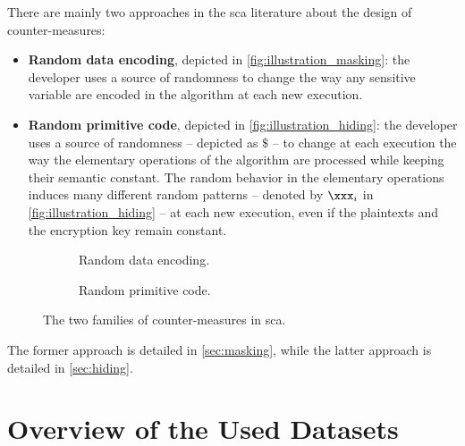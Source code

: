     There are mainly two approaches in the \gls{sca} literature about the design of counter-measures:
    \begin{itemize}
        \item \textbf{Random data encoding}, depicted in \autoref{fig:illustration_masking}: the developer uses a source of randomness to change the way any sensitive variable are encoded in the algorithm at each new execution.
        \item \textbf{Random primitive code}, depicted in \autoref{fig:illustration_hiding}: the developer uses a source of randomness -- depicted as \(\$\) -- to change at each execution the way the elementary operations of the algorithm are processed while keeping their semantic constant.
        The random behavior in the elementary operations induces many different random patterns -- denoted by \(\xxx_i\) in \autoref{fig:illustration_hiding} -- at each new execution, even if the plaintexts and the encryption key remain constant.
    \end{itemize}
    \begin{figure}
        \centering
        \begin{subfigure}{0.49 \textwidth}
            
            \caption{Random data encoding.}
            \label{fig:illustration_masking}
        \end{subfigure}
        \begin{subfigure}{0.49 \textwidth}
            
            \caption{Random primitive code.}
            \label{fig:illustration_hiding}
        \end{subfigure}
        \caption{The two families of counter-measures in \gls{sca}.}
        \label{}
    \end{figure}

    The former approach is detailed in \autoref{sec:masking}, while the latter approach is detailed in \autoref{sec:hiding}.

    
    

\section{Overview of the Used Datasets}
    \label{sec:datasets}
    

